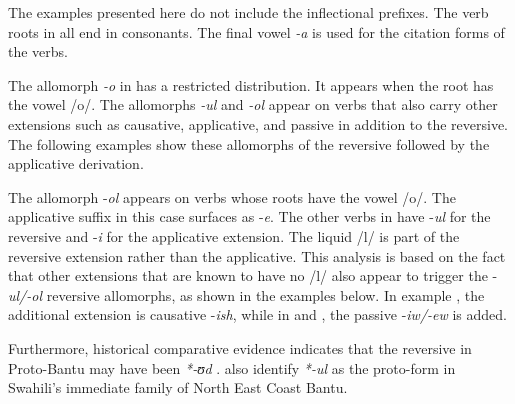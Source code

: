 \documentclass[output=paper]{langsci/langscibook}
\begin{document}
The examples presented here do not include the inflectional prefixes. The verb roots in  all end in consonants. The final vowel \textit{{}-a} is used for the citation forms of the verbs. 

The allomorph \textit{{}-o} in  has a restricted distribution. It appears when the root has the vowel /o/. The allomorphs \textit{{}-ul} and \textit{{}-ol} appear on verbs that also carry other extensions such as causative, applicative, and passive in addition to the reversive. The following examples show these allomorphs of the reversive followed by the applicative derivation.

\ea\label{ex:ngonyaningowa:4}
\ea\label{ex:ngonyaningowa:4a}
\ex\label{ex:ngonyaningowa:4b}
\ex\label{ex:ngonyaningowa:4c}
\ex\label{ex:ngonyaningowa:4d}
\ex\label{ex:ngonyaningowa:4e}
\z
\z

The allomorph -\textit{ol} appears on verbs whose roots have the vowel /o/. The applicative suffix in this case surfaces as -\textit{e}. The other verbs in  have -\textit{ul} for the reversive and -\textit{i} for the applicative extension. The liquid /l/ is part of the reversive extension rather than the applicative. This analysis is based on the fact that other extensions that are known to have no /l/ also appear to trigger the -\textit{ul/-ol} reversive allomorphs, as shown in the examples below. In example , the additional extension is causative -\textit{ish}, while in  and , the passive -\textit{iw/-ew} is added.

\ea\label{ex:ngonyaningowa:5}
\ea\label{ex:ngonyaningowa:5a}
\ex\label{ex:ngonyaningowa:5b}
\ex\label{ex:ngonyaningowa:5c}
\ex\label{ex:ngonyaningowa:5d}
\ex\label{ex:ngonyaningowa:5e}
\z
\z 

Furthermore, historical comparative evidence indicates that the reversive in Proto-Bantu may have been \textit{*-ʊd} \citep{Schadeberg2003,Meeussen1967}. \citet[370]{NurseHinnebusch1993} also identify \textit{*-ul} as the proto-form in Swahili’s immediate family of North East Coast Bantu. 
\end{document}

